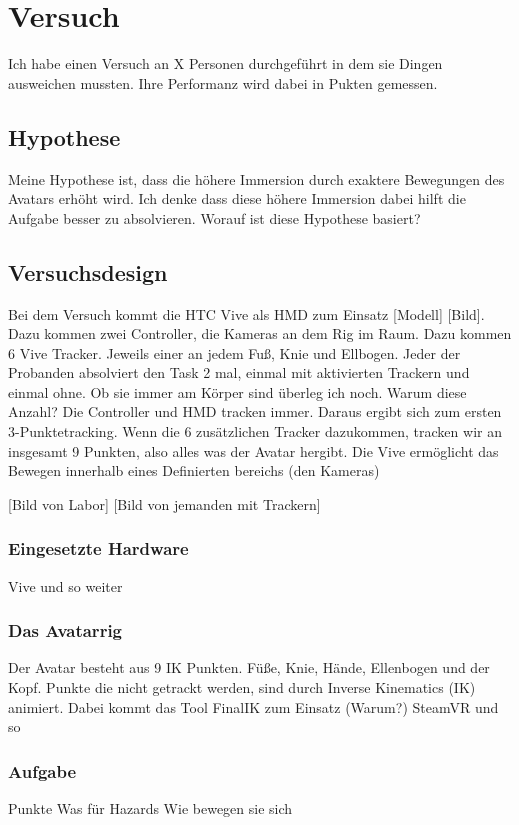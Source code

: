\chapter{Versuch}

Ich habe einen Versuch an X Personen durchgeführt in dem sie Dingen ausweichen mussten. Ihre Performanz wird dabei in Pukten gemessen.

\section{Hypothese}
Meine Hypothese ist, dass die höhere Immersion durch exaktere Bewegungen des Avatars erhöht wird. Ich denke dass diese höhere Immersion dabei hilft die Aufgabe besser zu absolvieren.
Worauf ist diese Hypothese basiert?

\section{Versuchsdesign}
Bei dem Versuch kommt die HTC Vive als HMD zum Einsatz [Modell] [Bild]. Dazu kommen zwei Controller, die Kameras an dem Rig im Raum. Dazu kommen 6 Vive Tracker. Jeweils einer an jedem Fuß, Knie und Ellbogen.
Jeder der Probanden absolviert den Task 2 mal, einmal mit aktivierten Trackern und einmal ohne. Ob sie immer am Körper sind überleg ich noch.
Warum diese Anzahl?
Die Controller und HMD tracken immer. Daraus ergibt sich zum ersten 3-Punktetracking.
Wenn die 6 zusätzlichen Tracker dazukommen, tracken wir an insgesamt 9 Punkten, also alles was der Avatar hergibt.
Die Vive ermöglicht das Bewegen innerhalb eines Definierten bereichs (den Kameras)

[Bild von Labor] [Bild von jemanden mit Trackern]

\subsection{Eingesetzte Hardware}
Vive und so weiter
 
\subsection{Das Avatarrig}
Der Avatar besteht aus 9 IK Punkten. Füße, Knie, Hände, Ellenbogen und der Kopf.
Punkte die nicht getrackt werden, sind durch Inverse Kinematics (IK) animiert. Dabei kommt das Tool FinalIK zum Einsatz (Warum?)
SteamVR und so
 
 \subsection{Aufgabe}
 Punkte
 Was für Hazards
 Wie bewegen sie sich

